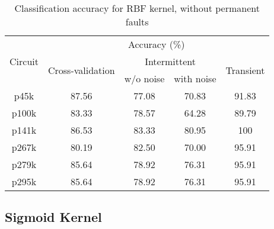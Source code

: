 \begin{table}[h]

	\captionsetup{justification=centering}
\begin{tabular}{ccccc}
\hline
\multirow{3}{*}{Circuit} & \multicolumn{4}{c}{Accuracy (\%)}                                                                 \\ \cline{2-5} 
                         & \multirow{2}{*}{Cross-validation} & \multicolumn{2}{c}{Intermittent} & \multirow{2}{*}{Transient} \\ \cline{3-4}
                         &                                   & w/o noise      & with noise      &                            \\ \hline
p45k                     & 87.56                             & 77.08          & 70.83           & 91.83                      \\
p100k                    & 83.33                             & 78.57          & 64.28           & 89.79                      \\
p141k                    & 86.53                             & 83.33          & 80.95           & 100                        \\
p267k                    & 80.19                             & 82.50          & 70.00           & 95.91                      \\
p279k                    & 85.64                             & 78.92          & 76.31           & 95.91                      \\
p295k                    & 85.64                             & 78.92          & 76.31           & 95.91  						  \\
\hline
\end{tabular}
\caption {Classification accuracy for RBF kernel, without permanent faults}
\label{tab:rbfwop}
\end{table}

\subsection{Sigmoid Kernel}

